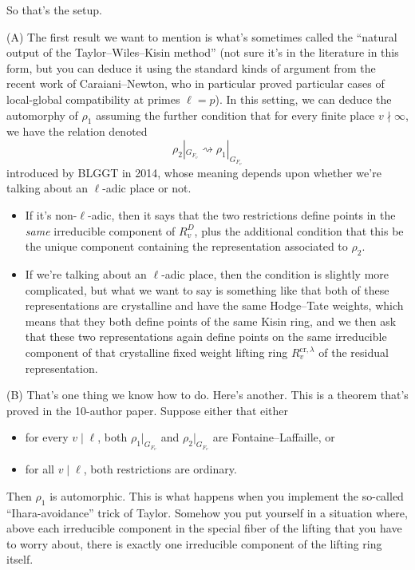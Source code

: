 \documentclass[reqno]{amsart} 
\begin{document}
So that's the setup.

(A) The first result we want to mention is what's sometimes called the ``natural output of the Taylor--Wiles--Kisin method'' (not sure it's in the literature in this form, but you can deduce it using the standard kinds of argument from the recent work of Caraiani--Newton, who in particular proved particular cases of local-global compatibility at primes $\ell = p$).
In this setting, we can deduce the automorphy of $\rho _1$ assuming the further condition that for every finite place $v \nmid \infty$, we have the relation denoted
\begin{equation*}
  \rho_2 |_{G_{F_v}} \rightsquigarrow \rho_1 |_{G_{F_v}}
\end{equation*}
introduced by BLGGT in 2014, whose meaning depends upon whether we're talking about an $\ell$-adic place or not.
\begin{itemize}
\item If it's non-$\ell$-adic, then it says that the two restrictions define points in the \emph{same} irreducible component of $R_v^D$, plus the additional condition that this be the unique component containing the representation associated to $\rho_2$.
\item If we're talking about an $\ell$-adic place, then the condition is slightly more complicated, but what we want to say is something like that both of these representations are crystalline and have the same Hodge--Tate weights, which means that they both define points of the same Kisin ring, and we then ask that these two representations again define points on the same irreducible component of that crystalline fixed weight lifting ring $R_v^{\mathrm{cr}, \lambda}$ of the residual representation.
\end{itemize}

(B) That's one thing we know how to do.  Here's another.  This is a theorem that's proved in the 10-author paper.  Suppose either that either
\begin{itemize}
\item for every $v \mid \ell$, both $\rho_1 |_{G_{F_v}}$ and $\rho_2 |_{G_{F_v}}$ are Fontaine--Laffaille, or
\item for all $v \mid \ell$, both restrictions are ordinary.
\end{itemize}
Then $\rho_1$ is automorphic.  This is what happens when you implement the so-called ``Ihara-avoidance'' trick of Taylor.  Somehow you put yourself in a situation where, above each irreducible component in the special fiber of the lifting that you have to worry about, there is exactly one irreducible component of the lifting ring itself.
\end{document}
